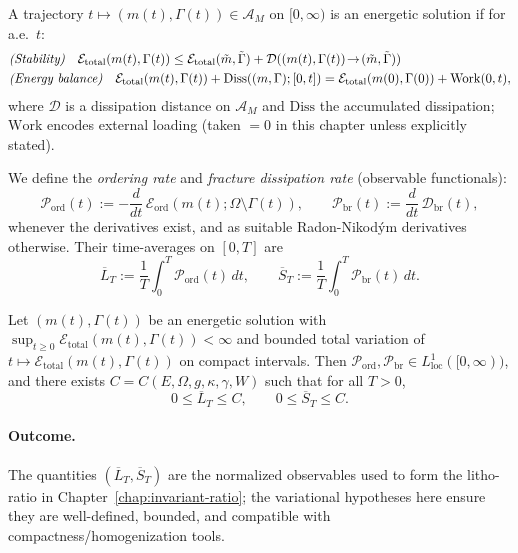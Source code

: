 \begin{definition}\label{def:energetic-solution}
A trajectory $t\mapsto (m(t),\Gamma(t))\in\mathcal{A}_M$ on $[0,\infty)$ is an energetic solution if for a.e.~$t$:
\begin{align*}
  &\text{\emph{(Stability)}}\quad 
  \mathcal{E}_{\mathrm{total}}(m(t),\Gamma(t)) \le \mathcal{E}_{\mathrm{total}}(\tilde m,\tilde\Gamma) + \mathcal{D}((m(t),\Gamma(t))\!\to\!(\tilde m,\tilde\Gamma))\\
  &\text{\emph{(Energy balance)}}\quad 
  \mathcal{E}_{\mathrm{total}}(m(t),\Gamma(t)) + \mathrm{Diss}((m,\Gamma);[0,t]) = \mathcal{E}_{\mathrm{total}}(m(0),\Gamma(0)) + \mathrm{Work}(0,t),
\end{align*}
where $\mathcal{D}$ is a dissipation distance on $\mathcal{A}_M$ and $\mathrm{Diss}$ the accumulated dissipation; $\mathrm{Work}$ encodes external loading (taken $=0$ in this chapter unless explicitly stated).
\end{definition}

We define the \emph{ordering rate} and \emph{fracture dissipation rate} (observable functionals):
\[
  \mathcal{P}_{\mathrm{ord}}(t) := -\frac{d}{dt}\,\mathcal{E}_{\mathrm{ord}}(m(t);\Omega\setminus\Gamma(t)),
  \qquad
  \mathcal{P}_{\mathrm{br}}(t) := \frac{d}{dt}\,\mathcal{D}_{\mathrm{br}}(t),
\]
whenever the derivatives exist, and as suitable Radon-Nikodým derivatives otherwise. Their time-averages on $[0,T]$ are
\[
  \overline{L}_T := \frac{1}{T}\int_0^T \mathcal{P}_{\mathrm{ord}}(t)\,dt,
  \qquad
  \overline{S}_T := \frac{1}{T}\int_0^T \mathcal{P}_{\mathrm{br}}(t)\,dt.
\]

\begin{lemma}\label{lem:rates-bounds}
Let $(m(t),\Gamma(t))$ be an energetic solution with $\sup_{t\ge 0}\mathcal{E}_{\mathrm{total}}(m(t),\Gamma(t))<\infty$ and bounded total variation of $t\mapsto \mathcal{E}_{\mathrm{total}}(m(t),\Gamma(t))$ on compact intervals.
Then $\mathcal{P}_{\mathrm{ord}},\mathcal{P}_{\mathrm{br}}\in L^1_{\mathrm{loc}}([0,\infty))$, and there exists $C=C(E,\Omega,g,\kappa,\gamma,W)$ such that for all $T>0$,
\[
  0\le \overline{L}_T \le C,\qquad 0\le \overline{S}_T \le C.
\]
\end{lemma}

\paragraph{Outcome.}
The quantities $(\overline{L}_T,\overline{S}_T)$ are the normalized observables used to form the litho-ratio in Chapter~\ref{chap:invariant-ratio}; the variational hypotheses here ensure they are well-defined, bounded, and compatible with compactness/homogenization tools.

